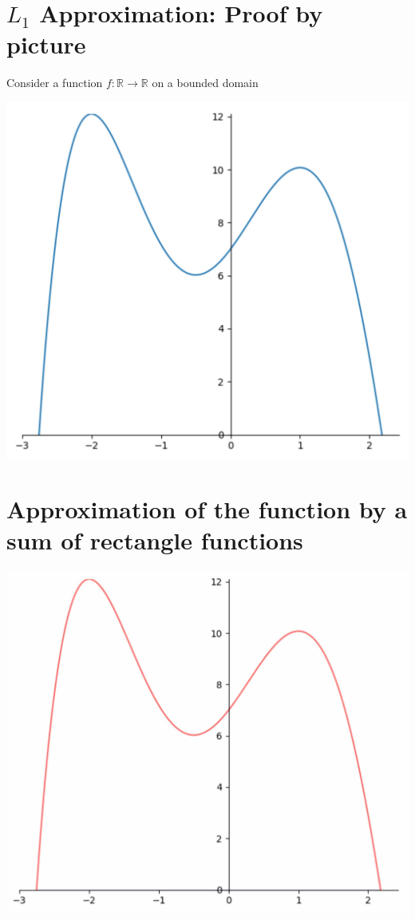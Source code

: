 \documentclass[10pt]{article}
\begin{document}
\section*{$L_{1}$ Approximation: Proof by picture}
Consider a function $f: \mathbb{R} \rightarrow \mathbb{R}$ on a bounded domain

\begin{center}
\includegraphics[max width=\textwidth]{2024_01_08_0e0dcffe4bc8c6049046g-20}
\end{center}

\section*{Approximation of the function by a sum of rectangle functions}
\begin{center}
\includegraphics[max width=\textwidth]{2024_01_08_0e0dcffe4bc8c6049046g-21(1)}
\end{center}
\end{document}
